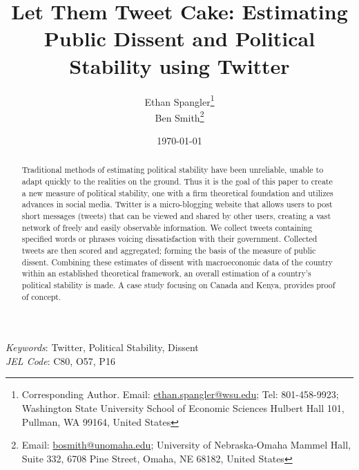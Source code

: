 \documentclass[12pt]{article}
\begin{document}
  


\begin{titlepage}




\title{Let Them Tweet Cake: Estimating Public Dissent and Political Stability using Twitter}



\author{Ethan Spangler\thanks{Corresponding Author. Email: {\href{mailto:ethan.spangler@wsu.edu}{ethan.spangler@wsu.edu}}; Tel: 801-458-9923; Washington State University School of Economic Sciences Hulbert Hall 101, Pullman, WA 99164, United States}  \\
Ben Smith\thanks{Email: {\href{mailto:bosmith@unomaha.edu}{bosmith@unomaha.edu}}; University of Nebraska-Omaha Mammel Hall, Suite 332, 6708 Pine Street, Omaha, NE 68182, United States}}



\date{\today}

\maketitle

\begin{abstract}
\noindent Traditional methods of estimating political stability have been unreliable, unable to adapt quickly to the realities on the ground. Thus it is the goal of this paper to create a new measure of political stability, one with a firm theoretical foundation and utilizes advances in social media. Twitter is a micro-blogging website that allows users to post short messages (tweets) that can be viewed and shared by other users, creating a vast network of freely and easily observable information. We collect tweets containing specified words or phrases voicing dissatisfaction with their government. Collected tweets are then scored and aggregated; forming the basis of the measure of public dissent. Combining these estimates of dissent with macroeconomic data of the country within an established theoretical framework, an overall estimation of a country's political stability is made. A case study focusing on Canada and Kenya, provides proof of concept.
\end{abstract}

\noindent \textit{Keywords}: Twitter, Political Stability, Dissent \\

\noindent \textit{JEL Code}: C80, O57, P16




\end{titlepage}
\end{document}
